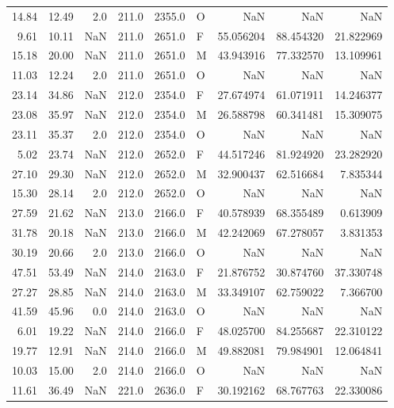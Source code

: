 \begin{table}
\begin{tabular}{rrrrrlrrr}
14.84 &  12.49 &      2.0 &  211.0 & 2355.0 &      O &       NaN &       NaN &       NaN \\
 9.61 &  10.11 &      NaN &  211.0 & 2651.0 &      F & 55.056204 & 88.454320 & 21.822969 \\
15.18 &  20.00 &      NaN &  211.0 & 2651.0 &      M & 43.943916 & 77.332570 & 13.109961 \\
11.03 &  12.24 &      2.0 &  211.0 & 2651.0 &      O &       NaN &       NaN &       NaN \\
23.14 &  34.86 &      NaN &  212.0 & 2354.0 &      F & 27.674974 & 61.071911 & 14.246377 \\
23.08 &  35.97 &      NaN &  212.0 & 2354.0 &      M & 26.588798 & 60.341481 & 15.309075 \\
23.11 &  35.37 &      2.0 &  212.0 & 2354.0 &      O &       NaN &       NaN &       NaN \\
 5.02 &  23.74 &      NaN &  212.0 & 2652.0 &      F & 44.517246 & 81.924920 & 23.282920 \\
27.10 &  29.30 &      NaN &  212.0 & 2652.0 &      M & 32.900437 & 62.516684 &  7.835344 \\
15.30 &  28.14 &      2.0 &  212.0 & 2652.0 &      O &       NaN &       NaN &       NaN \\
27.59 &  21.62 &      NaN &  213.0 & 2166.0 &      F & 40.578939 & 68.355489 &  0.613909 \\
31.78 &  20.18 &      NaN &  213.0 & 2166.0 &      M & 42.242069 & 67.278057 &  3.831353 \\
30.19 &  20.66 &      2.0 &  213.0 & 2166.0 &      O &       NaN &       NaN &       NaN \\
47.51 &  53.49 &      NaN &  214.0 & 2163.0 &      F & 21.876752 & 30.874760 & 37.330748 \\
27.27 &  28.85 &      NaN &  214.0 & 2163.0 &      M & 33.349107 & 62.759022 &  7.366700 \\
41.59 &  45.96 &      0.0 &  214.0 & 2163.0 &      O &       NaN &       NaN &       NaN \\
 6.01 &  19.22 &      NaN &  214.0 & 2166.0 &      F & 48.025700 & 84.255687 & 22.310122 \\
19.77 &  12.91 &      NaN &  214.0 & 2166.0 &      M & 49.882081 & 79.984901 & 12.064841 \\
10.03 &  15.00 &      2.0 &  214.0 & 2166.0 &      O &       NaN &       NaN &       NaN \\
11.61 &  36.49 &      NaN &  221.0 & 2636.0 &      F & 30.192162 & 68.767763 & 22.330086 \\

\end{tabular}
\end{table}
